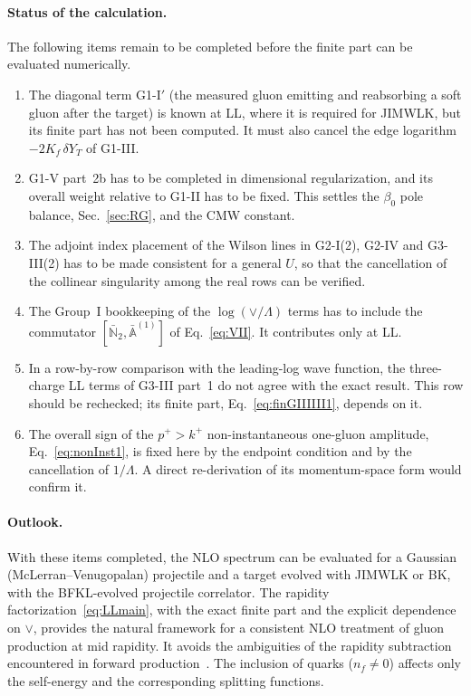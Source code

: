 \documentclass[aps,prd,onecolumn,superscriptaddress,nofootinbib,floatfix,longbibliography,11pt]{revtex4-2}
\numberwithin{equation}{section}
\def\mf#1{\mathbb{#1}}
\begin{document}
\paragraph*{Status of the calculation.} The following items remain to be completed before the finite part can be evaluated numerically.
\begin{enumerate}
\item The diagonal term G1-I$'$ (the measured gluon emitting and reabsorbing a soft gluon after the target) is known at LL, where it is required for JIMWLK, but its finite part has not been computed. It must also cancel the edge logarithm $-2K_f\,\delta Y_T$ of G1-III.
\item G1-V part~2b has to be completed in dimensional regularization, and its overall weight relative to G1-II has to be fixed. This settles the $\beta_0$ pole balance, Sec.~\ref{sec:RG}, and the CMW constant.
\item The adjoint index placement of the Wilson lines in G2-I(2), G2-IV and G3-III(2) has to be made consistent for a general $U$, so that the cancellation of the collinear singularity among the real rows can be verified.
\item The Group~I bookkeeping of the $\log(\vee/\Lambda)$ terms has to include the commutator $[\bar{\mf N}_2,\bar{\mf A}^{(1)}]$ of Eq.~\eqref{eq:VII}. It contributes only at LL.
\item In a row-by-row comparison with the leading-log wave function, the three-charge LL terms of G3-III part~1 do not agree with the exact result. This row should be rechecked; its finite part, Eq.~\eqref{eq:finGIIIIII1}, depends on it.
\item The overall sign of the $p^+>k^+$ non-instantaneous one-gluon amplitude, Eq.~\eqref{eq:nonInst1}, is fixed here by the endpoint condition and by the cancellation of $1/\Lambda$. A direct re-derivation of its momentum-space form would confirm it.
\end{enumerate}

\paragraph*{Outlook.} With these items completed, the NLO spectrum can be evaluated for a Gaussian (McLerran--Venugopalan) projectile and a target evolved with JIMWLK or BK, with the BFKL-evolved projectile correlator. The rapidity factorization~\eqref{eq:LLmain}, with the exact finite part and the explicit dependence on $\vee$, provides the natural framework for a consistent NLO treatment of gluon production at mid rapidity. It avoids the ambiguities of the rapidity subtraction encountered in forward production~\cite{Stasto:2013cha,Ducloue:2016shw,Iancu:2016vyg}. The inclusion of quarks ($n_f\neq0$) affects only the self-energy and the corresponding splitting functions.
\end{document}
